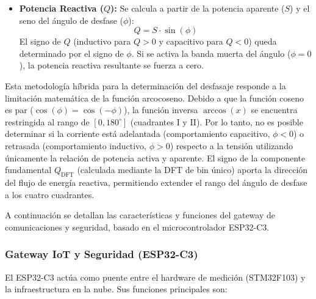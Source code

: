 \documentclass[12pt, a4paper]{article} %
\begin{document}
\begin{itemize}
        Si $Q_{\text{DFT}} < -\qty{5}{\text{VAr}}$, se invierte el signo del ángulo ($\phi = -\phi_{\text{mag}}$), lo que corresponde a los cuadrantes III y IV (comportamiento capacitivo). De lo contrario, se mantiene positivo (comportamiento inductivo). Finalmente, se aplican bandas muertas de seguridad: ante una potencia activa $P$ dentro del rango de $\pm\qty{5}{\watt}$ el factor de potencia ($FP$) se fuerza a cero, y ante una potencia reactiva de bin único $Q_{\text{DFT}}$ dentro del rango de $\pm\qty{5}{\text{VAr}}$, el ángulo de desfase ($\phi$) se fuerza a cero.
  \item \textbf{Potencia Reactiva ($Q$):} Se calcula a partir de la potencia aparente ($S$) y el seno del ángulo de desfase ($\phi$):
        \begin{equation}
          Q = S \cdot \sin(\phi)
        \end{equation}
        El signo de $Q$ (inductivo para $Q > 0$ y capacitivo para $Q < 0$) queda determinado por el signo de $\phi$. Si se activa la banda muerta del ángulo ($\phi = 0$), la potencia reactiva resultante se fuerza a cero.
\end{itemize}

Esta metodología híbrida para la determinación del desfasaje responde a la limitación matemática de la función arcocoseno. Debido a que la función coseno es par ($\cos(\phi) = \cos(-\phi)$), la función inversa $\arccos(x)$ se encuentra restringida al rango de $[0, 180^{\circ}]$ (cuadrantes I y II). Por lo tanto, no es posible determinar si la corriente está adelantada (comportamiento capacitivo, $\phi < 0$) o retrasada (comportamiento inductivo, $\phi > 0$) respecto a la tensión utilizando únicamente la relación de potencia activa y aparente. El signo de la componente fundamental $Q_{\text{DFT}}$ (calculada mediante la DFT de bin único) aporta la dirección del flujo de energía reactiva, permitiendo extender el rango del ángulo de desfase a los cuatro cuadrantes.

A continuación se detallan las características y funciones del gateway de comunicaciones y seguridad, basado en el microcontrolador ESP32-C3.

\subsubsection{Gateway IoT y Seguridad (ESP32-C3)}

El ESP32-C3 actúa como puente entre el hardware de medición (STM32F103) y la infraestructura en la nube. Sus funciones principales son:
\end{document}
